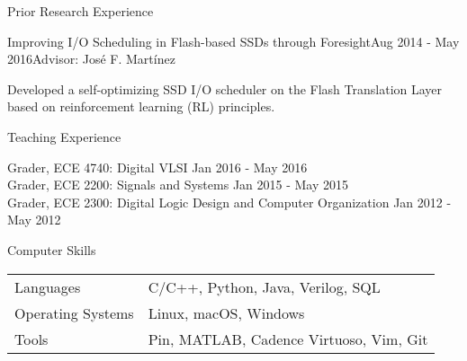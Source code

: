 \documentclass{resume} %
\begin{document}
\newpage


\begin{rSection}{Prior Research Experience}

\begin{rSubsection}{Improving I/O Scheduling in Flash-based SSDs through Foresight}{Aug 2014 - May 2016}{Advisor: José F. Martínez}

\item Developed a self-optimizing SSD I/O scheduler on the Flash Translation Layer based on reinforcement learning (RL) principles. 
\end{rSubsection}

\end{rSection}


\begin{rSection}{Teaching Experience}

Grader, ECE 4740: Digital VLSI \hfill {Jan 2016 - May 2016} \\
Grader, ECE 2200: Signals and Systems \hfill {Jan 2015 - May 2015} \\
Grader, ECE 2300: Digital Logic Design and Computer Organization \hfill{Jan 2012 - May 2012}

\end{rSection}


\begin{rSection}{Computer Skills}

\begin{tabular}{ll}
Languages & C/C++, Python, Java, Verilog, SQL \\
Operating Systems & Linux, macOS, Windows \\
Tools     & Pin, MATLAB, Cadence Virtuoso, Vim, Git \\
\end{tabular}

\end{rSection}






\end{document}
